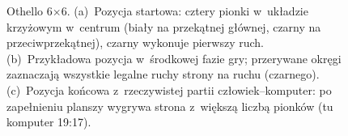 \begin{figure}[H]
\begin{subfigure}{0.32\textwidth}
\caption{}
\end{subfigure}
\caption{Othello 6$\times$6. (a)~Pozycja startowa: cztery pionki w~układzie krzyżowym w~centrum
(biały na przekątnej głównej, czarny na przeciwprzekątnej), czarny wykonuje pierwszy ruch.
(b)~Przykładowa pozycja w~środkowej fazie gry; przerywane okręgi zaznaczają wszystkie legalne ruchy
strony na ruchu (czarnego). (c)~Pozycja końcowa z~rzeczywistej partii człowiek--komputer: po
zapełnieniu planszy wygrywa strona z~większą liczbą pionków (tu komputer 19:17).}
\label{fig:board}
\end{figure}
